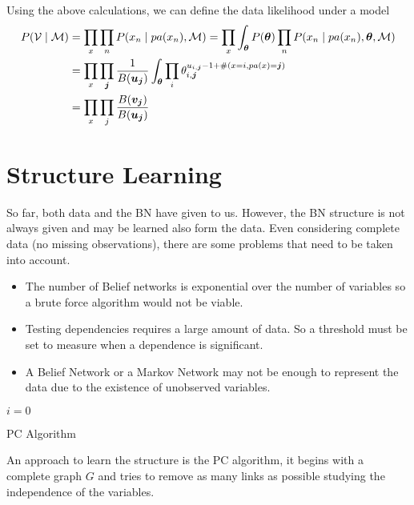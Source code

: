 Using the above calculations, we can define the data likelihood under a model
\[
  \begin{aligned}
    P(\mathcal{V} \mid \mathcal{M}) &= \prod_{x}\prod_{n}P(x_{n} \mid pa(x_{n}), \mathcal{M}) = \prod_{x} \int_{\bm{\theta}} P(\bm{\theta}) \prod_{n} P(x_{n}\mid pa(x_{n}), \bm{\theta}, \mathcal{M})\\
    &= \prod_{x} \prod_{\bm{j}} \frac{1}{B(\bm{u_{j}})} \int_{\bm{\theta}} \prod_{i}\theta_{i,\bm{j}}^{u_{i,\bm{j}}-1 + \#(x = i,pa(x)=\bm{j})}\\
    &= \prod_{x}\prod_{j} \frac{B(\bm{v_{j}})}{B(\bm{u_{j}})}
  \end{aligned}
\]

\section{Structure Learning}

So far, both data and the BN have given to us. However, the BN structure is not
always given and may be learned also form the data. Even considering complete
data (no missing observations), there are some problems that need to be taken
into account.
\begin{itemize}
    \item The number of Belief networks is exponential over the number of
    variables so a brute force algorithm would not be viable.
  \item Testing dependencies requires a large amount of data. So a threshold
    must be set to measure when a dependence is significant.
    \item A Belief Network or a Markov Network may not be enough to represent
    the data due to the existence of unobserved variables.
\end{itemize}


\begin{algorithm}[h]
  \SetAlgoLined
  \(i = 0\)\;
  \caption{PC Algorithm}
  \label{alg:pc1}
\end{algorithm}

An approach to learn the structure is the PC algorithm, it begins with a
complete graph \(G\) and tries to remove as many links as possible studying the
independence of the variables.

